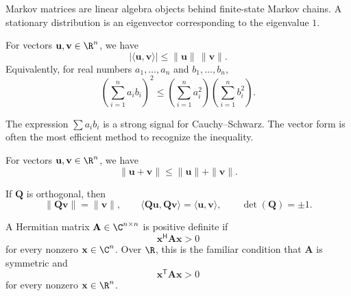     \begin{remark}
        Markov matrices are linear algebra objects behind finite-state Markov
        chains. A stationary distribution is an eigenvector corresponding to the
        eigenvalue $1$.
    \end{remark}

    \begin{theorem}
        For vectors $\mathbf{u},\mathbf{v}\in\R^n$, we have
        \[
            |\langle\mathbf{u},\mathbf{v}\rangle|
            \leq
            \|\mathbf{u}\|\,\|\mathbf{v}\|.
        \]
        Equivalently, for real numbers $a_1,\dots,a_n$ and
        $b_1,\dots,b_n$,
        \[
            \left(\sum_{i=1}^{n}a_i b_i\right)^2
            \leq
            \left(\sum_{i=1}^{n}a_i^2\right)
            \left(\sum_{i=1}^{n}b_i^2\right).
        \]
    \end{theorem}

    \begin{strategy}
        The expression $\sum a_i b_i$ is a strong signal for Cauchy--Schwarz.
        The vector form is often the most efficient method to recognize the inequality.
    \end{strategy}

    \begin{corollary}
        For vectors $\mathbf{u},\mathbf{v}\in\R^n$, we have
        \[
            \|\mathbf{u}+\mathbf{v}\|
            \leq
            \|\mathbf{u}\|+\|\mathbf{v}\|.
        \]
    \end{corollary}

    \begin{proposition}
        If $\mathbf{Q}$ is orthogonal, then
        \[
            \|\mathbf{Q}\mathbf{v}\|=\|\mathbf{v}\|,
            \qquad
            \langle\mathbf{Q}\mathbf{u},\mathbf{Q}\mathbf{v}\rangle
            =
            \langle\mathbf{u},\mathbf{v}\rangle,
            \qquad
            \det(\mathbf{Q})=\pm 1.
        \]
    \end{proposition}

    \begin{definition}
        A Hermitian matrix $\mathbf{A}\in\C^{n\times n}$ is positive definite if
        \[
            \mathbf{x}^{\mathsf H}\mathbf{A}\mathbf{x}>0
        \]
        for every nonzero $\mathbf{x}\in\C^n$. Over $\R$, this is the familiar
        condition that $\mathbf{A}$ is symmetric and
        \[
            \mathbf{x}^{\mathsf T}\mathbf{A}\mathbf{x}>0
        \]
        for every nonzero $\mathbf{x}\in\R^n$.
    \end{definition}

